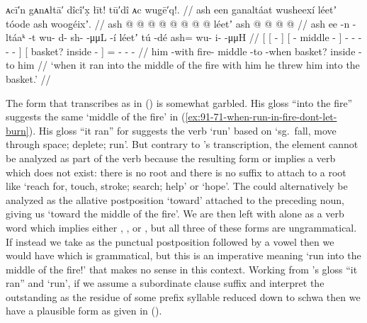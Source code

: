 \ex\label{ex:91-74-ran-into-fire-threw-into-basket}%
%
\begingl
	\glpreamble	ᴀcī′n gᴀnᴀłtā′ dîcî′x̣ łīt! tū′dî ᴀc wug̣ē′q!. //
	\glpreamble	ash een ganaltáat wusheexí léetʼ tóode ash woog̱éixʼ. //
	\gla	{} {} ash  @ {} {}
			{}  @ {} @ {} {}
			 @ {} @ {} @ {} @ {} @ {} {}
		{} léetʼ  {} {}
		ash @  @ {} @ {} @ {}  //
	\glb	{} {} ash ee -n {}
			{} - ltáaᵏ -t {}
			wu- d- sh-  -μμL -í {}
		{} léetʼ tú -dé {}
		ash= wu- i-  -μμH //
	\glc	{}[ {}[   - {}]
			{}[ - middle - {}]
			- - -  - - {}]
		{}[ basket? inside - {}]
		= - -  - //
	\gld	{} {} him {} -with {}
			{} fire- middle -to {}
			 {} {} {} {} -when {}
		{} basket? inside -to {}
		him  {} {} {} //
	\glft	‘when it ran into the middle of the fire with him he threw him into the basket.’
		//
\endgl
\xe

The form that \citeauthor{swanton:1909} transcribes as  in (\lastx) is somewhat garbled.  His gloss “into the fire” suggests the same  ‘middle of the fire’ in (\ref{ex:91-71-when-run-in-fire-dont-let-burn}).
His gloss “it ran” for  suggests the verb  ‘run’ based on  ‘sg.\ fall, move through space; deplete; run’.
But contrary to \citeauthor{swanton:1909}’s transcription, the  element cannot be analyzed as part of the verb because the resulting form  or  implies a verb  which does not exist: there is no root  and there is no suffix  to attach to a root like  ‘reach for, touch, stroke; search; help’ or  ‘hope’.
The  could alternatively be analyzed as the allative postposition  ‘toward’ attached to the preceding noun, giving us  ‘toward the middle of the fire’.
We are then left with  alone as a verb word which implies either , , or , but all three of these forms are ungrammatical.
If instead we take  as the punctual postposition  followed by a vowel then we would have  which is grammatical, but this is an imperative meaning ‘run into the middle of the fire!’ that makes no sense in this context.
Working from \citeauthor{swanton:1909}’s gloss “it ran” and  ‘run’, if we assume a subordinate clause suffix  and interpret the outstanding  as the residue of some prefix syllable reduced down to schwa then we have a plausible form  as given in (\lastx).

